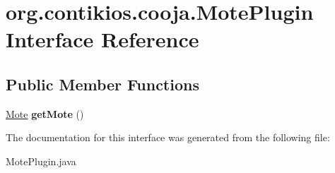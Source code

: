 \hypertarget{interfaceorg_1_1contikios_1_1cooja_1_1MotePlugin}{\section{org.\-contikios.\-cooja.\-Mote\-Plugin Interface Reference}
\label{interfaceorg_1_1contikios_1_1cooja_1_1MotePlugin}
}
\subsection*{Public Member Functions}
\begin{DoxyCompactItemize}
\item 
\hypertarget{interfaceorg_1_1contikios_1_1cooja_1_1MotePlugin_aded6cc666d06e6f8236356ba490d4147}{\hyperlink{interfaceorg_1_1contikios_1_1cooja_1_1Mote}{Mote} {\bfseries get\-Mote} ()}\label{interfaceorg_1_1contikios_1_1cooja_1_1MotePlugin_aded6cc666d06e6f8236356ba490d4147}

\end{DoxyCompactItemize}


The documentation for this interface was generated from the following file\-:\begin{DoxyCompactItemize}
\item 
Mote\-Plugin.\-java\end{DoxyCompactItemize}
